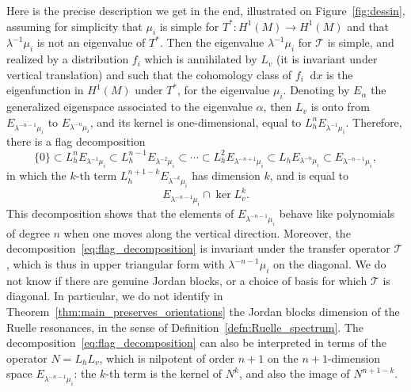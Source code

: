 \documentclass[JEP,XML,SOM,Unicode]{cedram}
\newcommand{\boT}{\mathcal{T}}
\newcommand{\dd}{\mathop{}\!\mathrm{d}}
\theoremstyle{definition}
\numberwithin{equation}{section}
\begin{document}
Here is the precise description we get in the end, illustrated on
Figure~\ref{fig:dessin}, assuming for simplicity that $\mu_i$ is simple for
$T^* : H^1(M) \to H^1(M)$ and that $\lambda^{-1}\mu_i$ is not an eigenvalue
of $T^*$. Then the eigenvalue $\lambda^{-1} \mu_i$ for $\boT$ is simple, and
realized by a distribution $f_i$ which is annihilated by $L_v$ (\ie it is
invariant under vertical translation) and such that the cohomology class of
$f_i \dd x$ is the eigenfunction in $H^1(M)$ under $T^*$, for the eigenvalue
$\mu_i$. Denoting by $E_\alpha$ the generalized eigenspace associated to the
eigenvalue $\alpha$, then $L_v$ is onto from $E_{\lambda^{-n-1} \mu_i}$ to
$E_{\lambda^{-n} \mu_i}$, and its kernel is one-dimensional, equal to $L_h^n
E_{\lambda^{-1}\mu_i}$. Therefore, there is a flag decomposition
\begin{equation}
\label{eq:flag_decomposition}
\{0\} \subset L_h^n E_{\lambda^{-1}\mu_i} \subset L_h^{n-1} E_{\lambda^{-2}\mu_i}
\subset \dotsb \subset L_h^2 E_{\lambda^{-n+1} \mu_i} \subset L_h E_{\lambda^{-n} \mu_i}
\subset E_{\lambda^{-n-1}\mu_i},
\end{equation}
in which the $k$-th term $L_h^{n+1-k} E_{\lambda^{-k} \mu_i}$ has dimension
$k$, and is equal to
\[
E_{\lambda^{-n-1}\mu_i} \cap \ker L_v^k.
\]
This
decomposition shows that the elements of $E_{\lambda^{-n-1}\mu_i}$ behave
like polynomials of degree $n$ when one moves along the vertical direction.
Moreover, the decomposition~\eqref{eq:flag_decomposition} is invariant under
the transfer operator $\boT$, which is thus in upper triangular form with
$\lambda^{-n-1}\mu_i$ on the diagonal. We do not know if there are genuine
Jordan blocks, or a choice of basis for which $\boT$ is diagonal. In
particular, we do not identify in
Theorem~\ref{thm:main_preserves_orientations} the Jordan blocks dimension of
the Ruelle resonances, in the sense of Definition~\ref{defn:Ruelle_spectrum}.
The decomposition~\eqref{eq:flag_decomposition} can also be interpreted in
terms of the operator $N = L_h L_v$, which is nilpotent of order $n+1$ on the
$n+1$-dimension space $E_{\lambda^{-n-1} \mu_i}$: the $k$-th term is the
kernel of $N^k$, and also the image of $N^{n+1-k}$.
%
\end{document}
